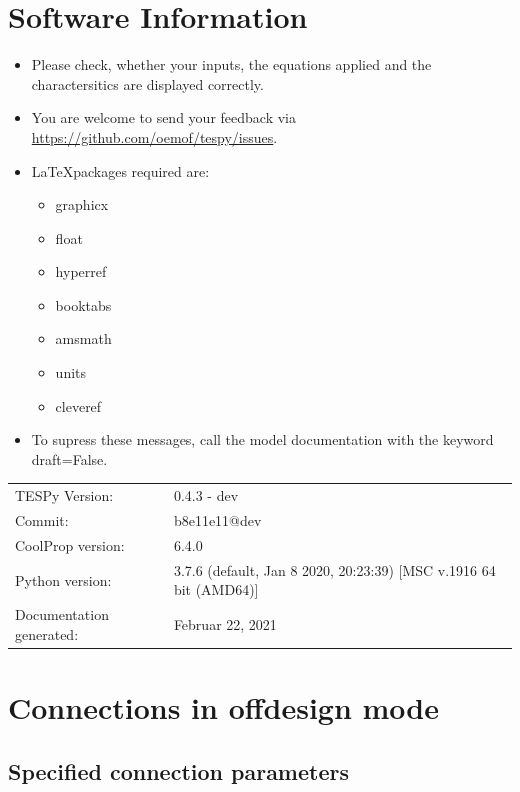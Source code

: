 \section*{Software Information}

\begin{itemize}
\item Please check, whether your inputs, the equations applied and the charactersitics are displayed correctly.
\item You are welcome to send your feedback via \url{https://github.com/oemof/tespy/issues}.
\item \LaTeX packages required are:
\begin{itemize}
\item graphicx
\item float
\item hyperref
\item booktabs
\item amsmath
\item units
\item cleveref
\end{itemize}
\item To supress these messages, call the model documentation with the keyword draft=False.
\end{itemize}

\begin{table}[H]
\begin{tabular}{ll}
TESPy Version:&0.4.3 - dev\\
Commit:&b8e11e11@dev\\
CoolProp version:&6.4.0\\
Python version:&3.7.6 (default, Jan  8 2020, 20:23:39) [MSC v.1916 64 bit (AMD64)]\\
Documentation generated:&Februar 22, 2021\\
\end{tabular}
\end{table}
\newpage\section{Connections in offdesign mode}

\subsection{Specified connection parameters}

